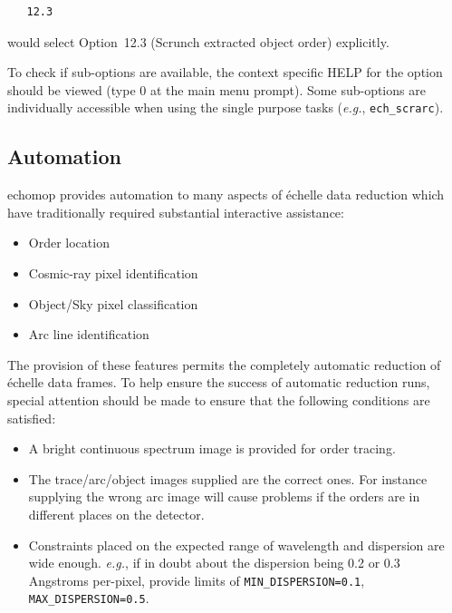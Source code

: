 \documentclass[11pt,twoside]{article}
\newcommand{\htmlref}[2]{#1}
\newcommand{\xlabel}[1]{}
\newcommand{\mlabel}[1]{\xlabel{#1}\label{#1}}
\newcommand{\myindex}[1]{\index{#1}}
\renewcommand{\myindex}[1]{}
\begin{document}
\begin{verbatim}
   12.3
\end{verbatim}

would select Option~12.3 (Scrunch extracted object order) explicitly.

To check if sub-options are available, the context specific HELP for the
option should be viewed (type 0 at the main menu prompt). Some
sub-options are individually accessible when using the single purpose
tasks ({\it{e.g.}}, \texttt{ech\_scrarc}).


\subsection{\mlabel{automation}Automation}
\myindex{Automation}

{\sc echomop} provides automation to many aspects of \'{e}chelle data reduction
which have traditionally required substantial interactive assistance:

\myindex{Automation!functions}
\begin{itemize}

\item Order location
\item Cosmic-ray pixel identification
\item Object/Sky pixel classification
\item Arc line identification

\end{itemize}

The provision of these features permits the completely automatic
reduction of \'{e}chelle data frames.  To help ensure the success of
automatic reduction runs, special attention should be made to ensure
that the following conditions are satisfied:

\myindex{Automation!requirements}
\begin{itemize}

\item A bright continuous spectrum image is provided for order
      tracing.

\item The trace/arc/object images supplied are the correct ones. For
      instance supplying the wrong arc image will cause problems if the
      orders are in different places on the detector.

\item Constraints placed on the expected range of wavelength and
      dispersion are wide enough. {\it{e.g.}}, if in doubt about the
      dispersion being 0.2 or 0.3 Angstroms per-pixel, provide limits of
      \htmlref{{\tt MIN\_DISPERSION=0.1}}{par_MIN_DISPERSION},
      \htmlref{{\tt MAX\_DISPERSION=0.5}}{par_MAX_DISPERSION}.

\end{itemize}
\end{document}
